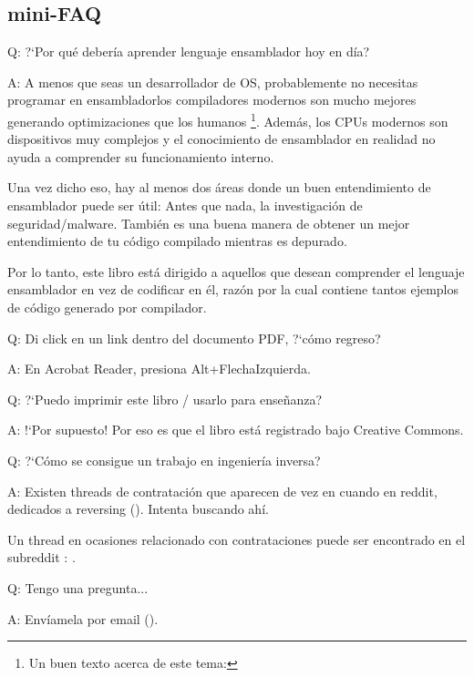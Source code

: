 \subsection*{mini-FAQ}

\par Q: ?`Por qu\'e deber\'ia aprender lenguaje ensamblador hoy en d\'ia?
\par A: A menos que seas un desarrollador de \ac{OS}, probablemente no necesitas programar en ensamblador\textemdash{}los compiladores modernos
son mucho mejores generando optimizaciones que los humanos
\footnote{Un buen texto acerca de este tema: \InSqBrackets{\AgnerFog}}.
Adem\'as, los \ac{CPU}s modernos son dispositivos muy complejos y el conocimiento de ensamblador en realidad no ayuda a comprender su funcionamiento interno.

Una vez dicho eso, hay al menos dos \'areas donde un buen entendimiento de ensamblador puede ser \'util:
Antes que nada, la investigaci\'on de seguridad/malware. Tambi\'en es una buena manera de obtener un mejor entendimiento de tu c\'odigo compilado mientras es depurado.

Por lo tanto, este libro est\'a dirigido a aquellos que desean comprender el lenguaje ensamblador en vez de codificar en \'el,
raz\'on por la cual contiene tantos ejemplos de c\'odigo generado por compilador.

\par Q: Di click en un link dentro del documento PDF, ?`c\'omo regreso?
\par A: En Acrobat Reader, presiona Alt+FlechaIzquierda.

\par Q: ?`Puedo imprimir este libro / usarlo para ense\~nanza?
\par A: !`Por supuesto! Por eso es que el libro est\'a registrado bajo Creative Commons.

\par Q: ?`C\'omo se consigue un trabajo en ingenier\'ia inversa?
\par A: Existen threads de contrataci\'on que aparecen de vez en cuando en reddit, dedicados a reversing\FNURLREDDIT{}
(\RedditHiringThread{}).
Intenta buscando ah\'i.

Un thread en ocasiones relacionado con contrataciones puede ser encontrado en el subreddit :
\NetsecHiringThread{}.

\par Q: Tengo una pregunta...
\par A: Env\'iamela por email (\EMAIL).

